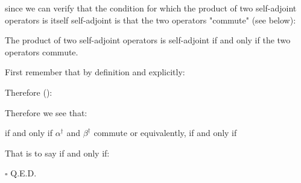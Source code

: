  	since we can verify that the condition for which the product of two self-adjoint operators is itself self-adjoint is that the two operators "commute" (see below):
 	\begin{theorem}
	The product of two self-adjoint operators is self-adjoint if and only if the two operators commute.
	\end{theorem}

	\begin{dem}
	First remember that by definition and explicitly:
	
	Therefore ():
	
	Therefore we see that:
	
	if and only if $\alpha^\dagger$ and $\beta^\dagger$ commute or equivalently, if and only if
	
	That is to say if and only if:
	
	\begin{flushright}
		$\square$  Q.E.D.
	\end{flushright}
	\end{dem}
	
	\pagebreak
